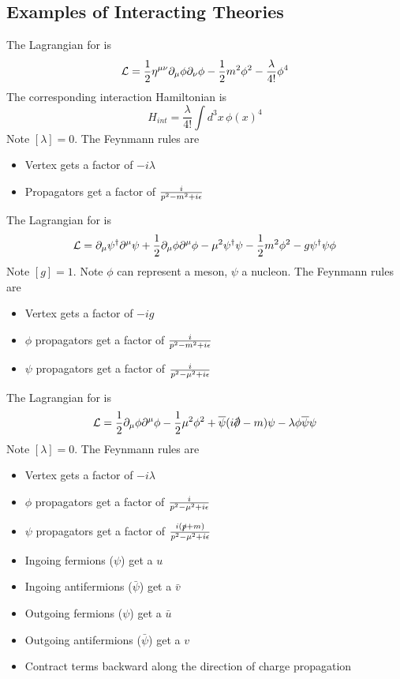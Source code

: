 \documentclass{article}
\begin{document}
\subsection{Examples of Interacting Theories}


\begin{definition}
The Lagrangian for  is 
\[
\mathcal{L} = \frac{1}{2}\eta^{\mu\nu} \partial_\mu\phi \partial_\nu\phi-\frac{1}{2}m^2\phi^2 - \frac{\lambda}{4!}\phi^4
\]
The corresponding interaction Hamiltonian is 
\[
H_{int} = \frac{\lambda}{4!} \int d^3x \, {\phi(x)}^4
\]
Note $[\lambda]=0$. The Feynmann rules are 
\begin{itemize}
    \item Vertex gets a factor of $-i\lambda$
    \item Propagators get a factor of $\frac{i}{p^2 - m^2 + i\epsilon}$
\end{itemize}
\end{definition}

\begin{definition}
The Lagrangian for  is 
\[
\mathcal{L} = \partial_\mu\psi^\dagger \partial^\mu\psi+\frac{1}{2}\partial_\mu\phi \partial^\mu\phi-\mu^2\psi^\dagger\psi-\frac{1}{2}m^2 \phi^2-g\psi^\dagger\psi\phi
\]
Note $[g]=1$. Note $\phi$ can represent a meson, $\psi$ a nucleon. The Feynmann rules are 
\begin{itemize}
    \item Vertex gets a factor of $-ig$
    \item $\phi$ propagators get a factor of $\frac{i}{p^2 - m^2 + i\epsilon}$
    \item  $\psi$ propagators get a factor of $\frac{i}{p^2 - \mu^2 + i\epsilon}$
\end{itemize}
\end{definition}

\begin{definition}
The Lagrangian for  is
\[
\mc{L} = \frac{1}{2}\del_\mu\phi \partial^\mu\phi-\frac{1}{2}\mu^2 \phi^2 + \bar{\psi}(i\slashed{\del}-m)\psi - \lambda\phi\bar{\psi}\psi
\]
Note $[\lambda] = 0$. The Feynmann rules are 
\begin{itemize}
    \item Vertex gets a factor of $-i\lambda$
    \item $\phi$ propagators get a factor of $\frac{i}{p^2 - \mu^2 + i\epsilon}$
    \item  $\psi$ propagators get a factor of $\frac{i(\slashed{p}+m)}{p^2 - \mu^2 + i\epsilon}$
    \item Ingoing fermions ($\psi$) get a $u$
    \item Ingoing antifermions ($\bar{\psi}$) get a $\bar{v}$
    \item Outgoing fermions ($\psi$) get a $\bar{u}$
    \item Outgoing antifermions ($\bar{\psi}$) get a $v$
    \item Contract terms backward along the direction of charge propagation
\end{itemize}
\end{definition}
\end{document}
